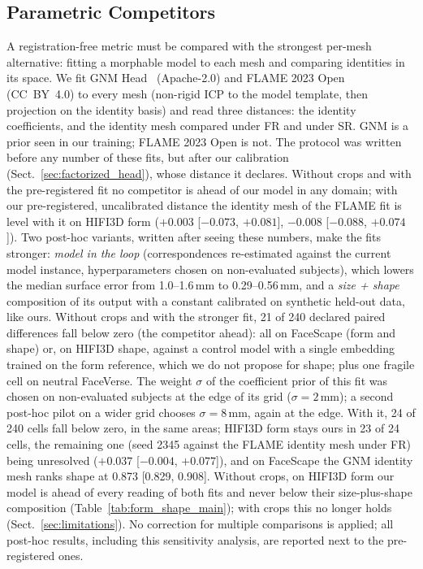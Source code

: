 \documentclass[10pt,twocolumn,letterpaper]{article}
\begin{document}
\subsection{Parametric Competitors}
\label{sec:param_competitors}
A registration-free metric must be compared with the strongest per-mesh alternative: fitting a morphable model to each mesh and comparing identities in its space. We fit GNM Head~\cite{ploumpis2026gnmhead} (Apache-2.0) and FLAME 2023 Open~\cite{li2017flame} (CC~BY~4.0) to every mesh (non-rigid ICP to the model template, then projection on the identity basis) and read three distances: the identity coefficients, and the identity mesh compared under FR and under SR. GNM is a prior seen in our training; FLAME 2023 Open is not. The protocol was written before any number of these fits, but after our calibration (Sect.~\ref{sec:factorized_head}), whose distance it declares. Without crops and with the pre-registered fit no competitor is ahead of our model in any domain; with our pre-registered, uncalibrated distance the identity mesh of the FLAME fit is level with it on HIFI3D form ($+0.003$ [$-0.073$, $+0.081$], $-0.008$ [$-0.088$, $+0.074$]). Two post-hoc variants, written after seeing these numbers, make the fits stronger: \emph{model in the loop} (correspondences re-estimated against the current model instance, hyperparameters chosen on non-evaluated subjects), which lowers the median surface error from 1.0--1.6\,mm to 0.29--0.56\,mm, and a \emph{size + shape} composition of its output with a constant calibrated on synthetic held-out data, like ours. Without crops and with the stronger fit, 21 of 240 declared paired differences fall below zero (the competitor ahead): all on FaceScape (form and shape) or, on HIFI3D shape, against a control model with a single embedding trained on the form reference, which we do not propose for shape; plus one fragile cell on neutral FaceVerse. The weight $\sigma$ of the coefficient prior of this fit was chosen on non-evaluated subjects at the edge of its grid ($\sigma=2$\,mm); a second post-hoc pilot on a wider grid chooses $\sigma=8$\,mm, again at the edge. With it, 24 of 240 cells fall below zero, in the same areas; HIFI3D form stays ours in 23 of 24 cells, the remaining one (seed 2345 against the FLAME identity mesh under FR) being unresolved ($+0.037$ [$-0.004$, $+0.077$]), and on FaceScape the GNM identity mesh ranks shape at 0.873 [0.829, 0.908]. Without crops, on HIFI3D form our model is ahead of every reading of both fits and never below their size-plus-shape composition (Table~\ref{tab:form_shape_main}); with crops this no longer holds (Sect.~\ref{sec:limitations}). No correction for multiple comparisons is applied; all post-hoc results, including this sensitivity analysis, are reported next to the pre-registered ones.
\end{document}
